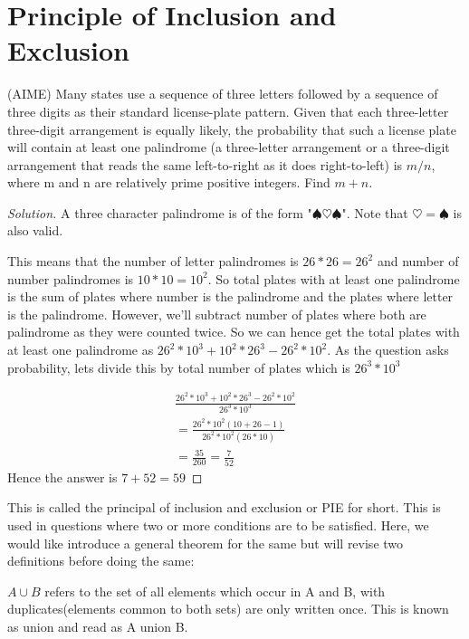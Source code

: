 \section{Principle of Inclusion and Exclusion}
\begin{example}
    (AIME) Many states use a sequence of three letters followed by a sequence of three 
    digits as their standard license-plate pattern. Given that each three-letter three-digit 
    arrangement is equally likely, the probability that such a license plate will contain at 
    least one palindrome (a three-letter arrangement or a three-digit arrangement that reads 
    the same left-to-right as it does right-to-left) is $m/n$, where m and n are relatively 
    prime positive integers. Find $m + n$.
\end{example}
\begin{proof}
    [Solution]
    A three character palindrome is of the form "$\spadesuit \heartsuit \spadesuit$". 
    Note that $\heartsuit = \spadesuit$ is also valid.\par
    This means that the number of letter palindromes is $26*26=26^2$ and number of number 
    palindromes is $10*10=10^2$. So total plates with at least one palindrome is the sum of 
    plates where number is the palindrome and the plates where letter is the palindrome. 
    However, we'll subtract number of plates where both are palindrome as they were counted 
    twice. So we can hence get the total plates with at least one palindrome as 
    $26^2*10^3+10^2*26^3-26^2*10^2$. As the question asks probability, lets 
    divide this by total number of plates which is $26^3*10^3$\par 
\begin{align*}
\frac{26^2*10^3+10^2*26^3-26^2*10^2}{26^3*10^3}\\
= \frac{26^2*10^2(10+26-1)}{26^2*10^2(26*10)}\\
=\frac{35}{260}=\frac{7}{52}
\end{align*}
Hence the answer is $7+52=59$
\end{proof}
This is called the principal of inclusion and exclusion or PIE for short. 
This is used in questions where two or more conditions are to be satisfied. 
Here, we would like introduce a general theorem for the same but will revise 
two definitions before doing the same:
\begin{definition}
$A \cup B$ refers to the set of all elements which occur in A and B, 
with duplicates(elements common to both sets) are only written once. 
This is known as union and read as A union B.
\end{definition}
